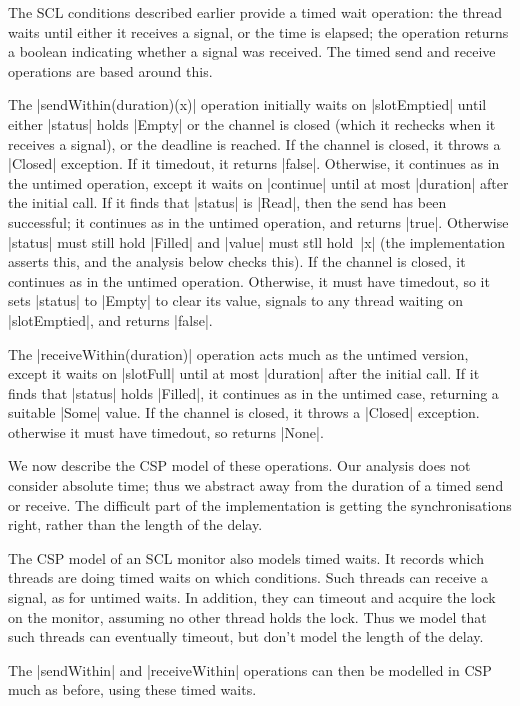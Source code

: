 The SCL conditions described earlier provide a timed wait operation: the
thread waits until either it receives a signal, or the time is elapsed; the
operation returns a boolean indicating whether a signal was received.  The
timed send and receive operations are based around this. 

The |sendWithin(duration)(x)| operation initially waits on |slotEmptied| until
either |status| holds |Empty| or the channel is closed (which it rechecks when
it receives a signal), or the deadline is reached.  If the channel is closed,
it throws a |Closed| exception.  If it timedout, it returns |false|.
Otherwise, it continues as in the untimed operation, except it waits on
|continue| until at most |duration| after the initial call.  If it finds that
|status| is |Read|, then the send has been successful; it continues as in the
untimed operation, and returns |true|.  Otherwise |status| must still hold
|Filled| and |value| must stll hold~|x| (the implementation asserts this, and
the analysis below checks this).  If the channel is closed, it continues as in
the untimed operation.  Otherwise, it must have timedout, so it sets |status|
to |Empty| to clear its value, signals to any thread waiting on |slotEmptied|,
and returns |false|.

The |receiveWithin(duration)| operation acts much as the untimed version,
except it waits on |slotFull| until at most |duration| after the initial
call.  If it finds that |status| holds |Filled|, it continues as in the
untimed case, returning a suitable |Some| value.  If the channel is closed, it
throws a |Closed| exception.  otherwise it must have timedout, so returns
|None|.  


We now describe the CSP model of these operations.  Our analysis does not
consider absolute time; thus we abstract away from the duration of a timed
send or receive.  The difficult part of the implementation is getting the
synchronisations right, rather than the length of the delay. 

The CSP model of an SCL monitor also models timed waits.  It records which
threads are doing timed waits on which conditions.  Such threads can receive a
signal, as for untimed waits.  In addition, they can timeout and acquire the
lock on the monitor, assuming no other thread holds the lock.  Thus we model
that such threads can eventually timeout, but don't model the length of the
delay. 

The |sendWithin| and |receiveWithin| operations can then be modelled in CSP
much as before, using these timed waits.


